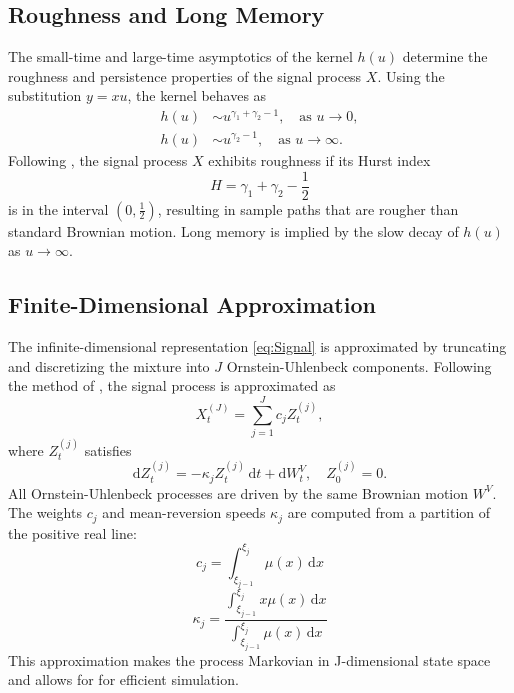\subsection{Roughness and Long Memory} \label{subsec:RoughnessLongMemory}

The small-time and large-time asymptotics of the kernel $h(u)$ determine the roughness and persistence properties of the signal process $X$. Using the substitution $y = xu$, the kernel behaves as
\begin{align} \label{eq:KernelAsyptotics}
    h(u) &\sim u^{\gamma_1 + \gamma_2 - 1}, \quad \text{as } u \to 0,\\
    h(u) &\sim u^{\gamma_2 - 1}, \quad \text{as } u \to \infty.
\end{align}
Following \citet{BennedsenLundePakkanen2021}, the signal process $X$ exhibits roughness if its Hurst index
\begin{equation} \label{eq:HurstIndex}
    H = \gamma_1 + \gamma_2 - \frac{1}{2}
\end{equation}
is in the interval $\left(0,\frac{1}{2}\right)$, resulting in sample paths that are rougher than standard Brownian motion. Long memory is implied by the slow decay of $h(u)$ as $u \to \infty$.


\subsection{Finite-Dimensional Approximation} \label{subsec:FiniteDimensionalApproximation}

The infinite-dimensional representation \eqref{eq:Signal} is approximated by truncating and discretizing the mixture into $J$ Ornstein-Uhlenbeck components. Following the method of \citet{CarmonaCoutingMontseny2000}, the signal process is approximated as
\begin{equation} \label{eq:FiniteApprox}
    X_t^{(J)} = \sum_{j=1}^J c_j Z_t^{(j)},
\end{equation}
where $Z_t^{(j)}$ satisfies
\begin{equation}
    \mathrm{d} Z_t^{(j)} = -\kappa_j Z_t^{(j)} \,\mathrm{d}t + \mathrm{d}W_t^V,\quad Z_0^{(j)} = 0.
\end{equation}
All Ornstein-Uhlenbeck processes are driven by the same Brownian motion $W^V$. The weights $c_j$ and mean-reversion speeds $\kappa_j$ are computed from a partition of the positive real line:
\begin{equation} \label{eq:OUWeights}
    c_j = \int_{\xi_{j-1}}^{\xi_j} \mu(x) \, \mathrm{d}x
\end{equation}
\begin{equation} \label{eq:OUSpeeds}
    \kappa_j = \frac{\int_{\xi_{j-1}}^{\xi_j} x \mu(x) \, \mathrm{d}x}{\int_{\xi_{j-1}}^{\xi_j} \mu(x) \, \mathrm{d}x}
\end{equation}
This approximation makes the process Markovian in J-dimensional state space and allows for for efficient simulation.

